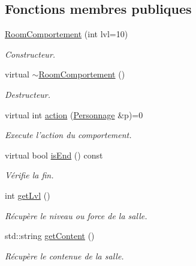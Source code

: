 \subsection*{Fonctions membres publiques}
\begin{DoxyCompactItemize}
\item 
\hyperlink{class_room_comportement_ad73012620d96a614fa9eb481227ad239}{Room\-Comportement} (int lvl=10)
\begin{DoxyCompactList}\small\item\em Constructeur. \end{DoxyCompactList}\item 
\hypertarget{class_room_comportement_a3ca1154569822e1a717cd14a849658ae}{virtual \hyperlink{class_room_comportement_a3ca1154569822e1a717cd14a849658ae}{$\sim$\-Room\-Comportement} ()}\label{class_room_comportement_a3ca1154569822e1a717cd14a849658ae}

\begin{DoxyCompactList}\small\item\em Destructeur. \end{DoxyCompactList}\item 
virtual int \hyperlink{class_room_comportement_ac5b509f405f9e52fea3a9392210fbbdb}{action} (\hyperlink{class_personnage}{Personnage} \&p)=0
\begin{DoxyCompactList}\small\item\em Execute l'action du comportement. \end{DoxyCompactList}\item 
virtual bool \hyperlink{class_room_comportement_a240991f90b07c35e0e9114e6a203ba88}{is\-End} () const 
\begin{DoxyCompactList}\small\item\em Vérifie la fin. \end{DoxyCompactList}\item 
int \hyperlink{class_room_comportement_a645473f228c0e73532a309ad512456eb}{get\-Lvl} ()
\begin{DoxyCompactList}\small\item\em Récupère le niveau ou force de la salle. \end{DoxyCompactList}\item 
std\-::string \hyperlink{class_room_comportement_a6927d638d17858a303d77b449c7552b4}{get\-Content} ()
\begin{DoxyCompactList}\small\item\em Récupère le contenue de la salle. \end{DoxyCompactList}\end{DoxyCompactItemize}
